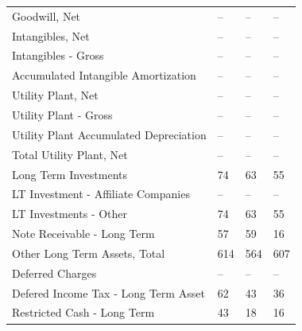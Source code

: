 \documentclass[grad,numbers]{coppe}
\begin{document}
\begin{longtable}[t]{llll}
  \hspace{1em}Goodwill, Net & -- & -- & --\\
  \hspace{1em}Intangibles, Net & -- & -- & --\\
  \hspace{1em}\hspace{1em}Intangibles - Gross & -- & -- & --\\
  \hspace{1em}\hspace{1em}Accumulated Intangible Amortization & -- & -- & --\\
  \hspace{1em}Utility Plant, Net & -- & -- & --\\
  \hspace{1em}\hspace{1em}Utility Plant - Gross & -- & -- & --\\
  \hspace{1em}\hspace{1em}Utility Plant Accumulated Depreciation & -- & -- & --\\
  \hspace{1em}Total Utility Plant, Net & -- & -- & --\\
  \hspace{1em}Long Term Investments & 74 & 63 & 55\\
  \hspace{1em}\hspace{1em}LT Investment - Affiliate Companies & -- & -- & --\\
  \hspace{1em}\hspace{1em}LT Investments - Other & 74 & 63 & 55\\
  \hspace{1em}Note Receivable - Long Term & 57 & 59 & 16\\
  \hspace{1em}Other Long Term Assets, Total & 614 & 564 & 607\\
  \hspace{1em}\hspace{1em}Deferred Charges & -- & -- & --\\
  \hspace{1em}\hspace{1em}Defered Income Tax - Long Term Asset & 62 & 43 & 36\\
  \hspace{1em}\hspace{1em}Restricted Cash - Long Term & 43 & 18 & 16\\

\end{longtable}
\end{document}
